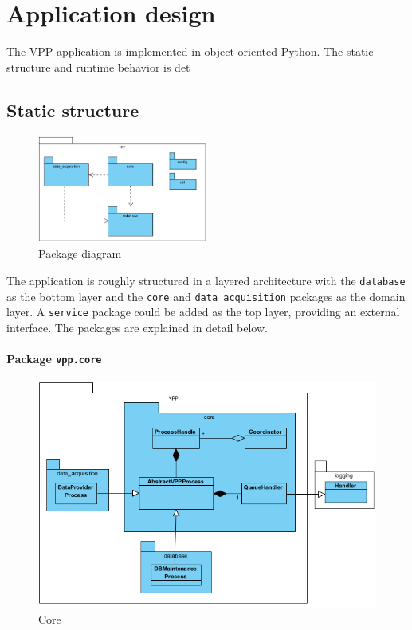 \newpage
\chapter{Application design} \label{ch:sw_design}
The VPP application is implemented in object-oriented Python. The static structure and runtime behavior is det

\section{Static structure}

\begin{figure}[H]
    \centering
    \includegraphics[width=0.5\textwidth]{figures/class_overview}
    \caption{Package diagram}
    \label{figureClassDiagram}
\end{figure}

The application is roughly structured in a layered architecture with the \texttt{database} as the bottom layer and the \texttt{core} and \texttt{data\_acquisition} packages as the domain layer. A \texttt{service} package could be added as the top layer, providing an external interface. The packages are explained in detail below.


\subsubsection{Package \texttt{vpp.core}}

\begin{figure}[H]
    \centering
    \includegraphics[width=\textwidth]{figures/class_core}
    \caption{Core}
\end{figure}

